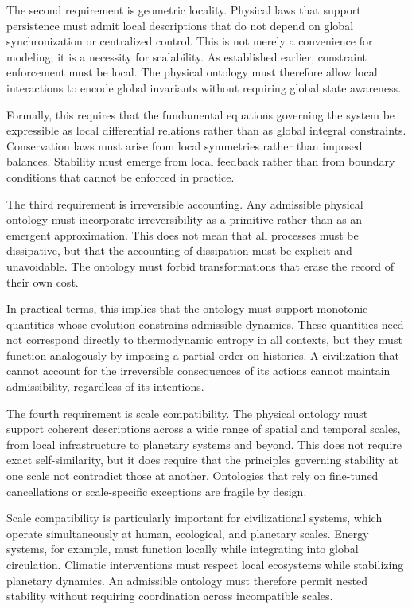 \documentclass[12pt,oneside]{book}
\begin{document}
The second requirement is geometric locality. Physical laws that support persistence must admit local descriptions that do not depend on global synchronization or centralized control. This is not merely a convenience for modeling; it is a necessity for scalability. As established earlier, constraint enforcement must be local. The physical ontology must therefore allow local interactions to encode global invariants without requiring global state awareness.

Formally, this requires that the fundamental equations governing the system be expressible as local differential relations rather than as global integral constraints. Conservation laws must arise from local symmetries rather than imposed balances. Stability must emerge from local feedback rather than from boundary conditions that cannot be enforced in practice.

The third requirement is irreversible accounting. Any admissible physical ontology must incorporate irreversibility as a primitive rather than as an emergent approximation. This does not mean that all processes must be dissipative, but that the accounting of dissipation must be explicit and unavoidable. The ontology must forbid transformations that erase the record of their own cost.

In practical terms, this implies that the ontology must support monotonic quantities whose evolution constrains admissible dynamics. These quantities need not correspond directly to thermodynamic entropy in all contexts, but they must function analogously by imposing a partial order on histories. A civilization that cannot account for the irreversible consequences of its actions cannot maintain admissibility, regardless of its intentions.

The fourth requirement is scale compatibility. The physical ontology must support coherent descriptions across a wide range of spatial and temporal scales, from local infrastructure to planetary systems and beyond. This does not require exact self-similarity, but it does require that the principles governing stability at one scale not contradict those at another. Ontologies that rely on fine-tuned cancellations or scale-specific exceptions are fragile by design.

Scale compatibility is particularly important for civilizational systems, which operate simultaneously at human, ecological, and planetary scales. Energy systems, for example, must function locally while integrating into global circulation. Climatic interventions must respect local ecosystems while stabilizing planetary dynamics. An admissible ontology must therefore permit nested stability without requiring coordination across incompatible scales.
\end{document}
